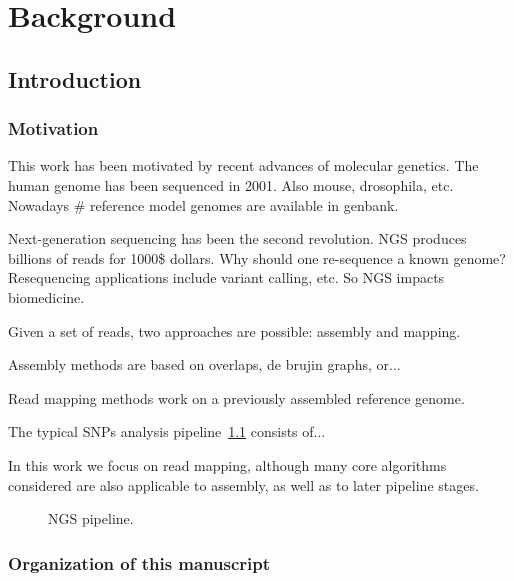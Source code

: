 \chapter{Background}


\section{Introduction}


\subsection{Motivation}

This work has been motivated by recent advances of molecular genetics.
The human genome has been sequenced in 2001. Also mouse, drosophila, etc.
Nowadays \# reference model genomes are available in genbank.

Next-generation sequencing has been the second revolution.
NGS produces billions of reads for 1000\$ dollars.
Why should one re-sequence a known genome?
Resequencing applications include variant calling, etc.
So NGS impacts biomedicine.

Given a set of reads, two approaches are possible: assembly and mapping.

Assembly methods are based on overlaps, de brujin graphs, or...

Read mapping methods work on a previously assembled reference genome.

The typical SNPs analysis pipeline~\ref{fig:ngs-pipeline} consists of...

In this work we focus on read mapping, although many core algorithms considered are also applicable to assembly, as well as to later pipeline stages.

\begin{figure}[h]
\caption{NGS pipeline.}
\label{fig:ngs-pipeline}
\end{figure}

\subsection{Organization of this manuscript}

